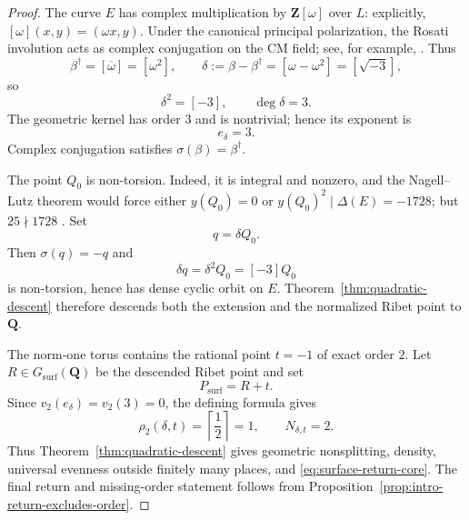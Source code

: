 \documentclass[11pt,letterpaper,reqno]{amsart}
\theoremstyle{definition}
\theoremstyle{remark}
\newcommand{\Q}{\mathbf Q}
\newcommand{\Z}{\mathbf Z}
\begin{document}
\begin{proof}
The curve $E$ has complex multiplication by $\Z[\omega]$ over $L$: explicitly,
$[\omega](x,y)=(\omega x,y)$.  Under the canonical principal polarization,
the Rosati involution acts as complex conjugation on the CM field; see, for
example,
\cite[Proposition~5.1]{Deligne1982}.  Thus
\[
 \beta^\dagger=[\overline\omega]=[\omega^2],
 \qquad
 \delta:=\beta-\beta^\dagger=[\omega-\omega^2]=[\sqrt{-3}],
\]
so
\begin{equation}\label{eq:surface-delta}
 \delta^2=[-3],
 \qquad \deg\delta=3.
\end{equation}
The geometric kernel has order $3$ and is nontrivial; hence its exponent is
\begin{equation}\label{eq:surface-kernel-exponent}
 e_\delta=3.
\end{equation}
Complex conjugation satisfies $\sigma(\beta)=\beta^\dagger$.

The point $Q_0$ is non-torsion.  Indeed, it is integral and nonzero, and the
Nagell--Lutz theorem would force either $y(Q_0)=0$ or
$y(Q_0)^2\mid\Delta(E)=-1728$; but $25\nmid1728$
\cite[Chapter~VIII, Corollary~7.2]{SilvermanAEC}.  Set
\[
 q=\delta Q_0.
\]
Then $\sigma(q)=-q$ and
\[
 \delta q=\delta^2Q_0=[-3]Q_0
\]
is non-torsion, hence has dense cyclic orbit on $E$.
Theorem~\ref{thm:quadratic-descent} therefore descends both the extension and the
normalized Ribet point to $\Q$.

The norm-one torus contains the rational point $t=-1$ of exact order $2$.
Let $R\in G_{\mathrm{surf}}(\Q)$ be the descended Ribet point and set
\[
 P_{\mathrm{surf}}=R+t.
\]
Since $v_2(e_\delta)=v_2(3)=0$, the defining formula gives
\[
 \rho_2(\delta,t)=\left\lceil\frac12\right\rceil=1,
 \qquad N_{\delta,t}=2.
\]
Thus Theorem~\ref{thm:quadratic-descent} gives geometric nonsplitting, density,
universal evenness outside finitely many places, and
\eqref{eq:surface-return-core}.  The final return and missing-order statement
follows from Proposition~\ref{prop:intro-return-excludes-order}.


\end{proof}
\end{document}
